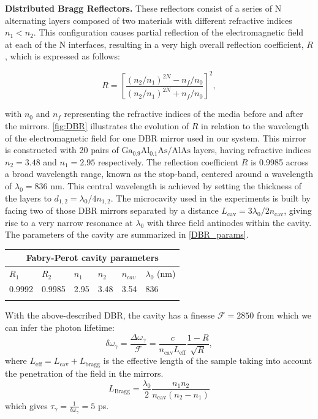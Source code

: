 \textbf{Distributed Bragg Reflectors.} These reflectors consist of a series of N alternating layers composed of two materials with different refractive indices $n_1<n_2$. This configuration causes partial reflection of the electromagnetic field at each of the N interfaces, resulting in a very high overall reflection coefficient, $R$, which is expressed as follows:

\begin{equation}
    R = \left[  \dfrac{(n_2/n_1)^{2N} - n_f/n_0}{(n_2/n_1)^{2N} + n_f/n_0} \right]^2,
\end{equation}

with $n_0$ and $n_f$ representing the refractive indices of the media before and after the mirrors. \autoref{fig:DBR} illustrates the evolution of $R$ in relation to the wavelength of the electromagnetic field for one DBR mirror used in our system. This mirror is constructed with 20 pairs of $\text{Ga}_{0.9}\text{Al}_{0.1}\text{As}/\text{AlAs}$ layers, having refractive indices $n_2 = 3.48$ and $n_1 = 2.95$ respectively. The reflection coefficient $R$ is 0.9985 across a broad wavelength range, known as the stop-band, centered around a wavelength of $\lambda_0 = 836$ nm. This central wavelength is achieved by setting the thickness of the layers to $d_{1,2} = \lambda_0 / 4n_{1,2}$. The microcavity used in the experiments is built by facing two of those DBR mirrors separated by a distance $L_{\mathrm{cav}}=3\lambda_0/2n_{\mathrm{cav}}$, giving rise to a very narrow resonance at $\lambda_0$ with three field antinodes within the cavity. The parameters of the cavity are summarized in \autoref{DBR_params}.

\begin{center}
    \begin{tabular}{ |p{1.5cm}|p{1.5cm}|p{1.5cm}|p{1.5cm}|p{1.5cm}|p{1.5cm}|}
    \hline
    \multicolumn{6}{|c|}{Fabry-Perot cavity parameters} \\
    \hline
    \hline
    $R_1$ & $R_2$ & $n_1$ & $n_2$ & $n_{cav}$ & $\lambda_0$ (nm) \\
    \hline
    0.9992  &  0.9985 & 2.95 & 3.48 & 3.54 & 836\\
    \hline
    \label{DBR_params}
    \end{tabular}
\end{center}

With the above-described DBR, the cavity has a finesse $\mathcal{F}=2850$ from which we can infer the photon lifetime:
\begin{equation}
    \delta \omega_{\gamma} = \dfrac{\Delta \omega_{\gamma}}{\mathcal{F}} = \dfrac{c}{n_{\mathrm{cav}} L_{\mathrm{eff}}} \dfrac{1-R}{\sqrt{R}},
\end{equation}
where $L_{\mathrm{eff}}= L_{\mathrm{cav}}+L_{\mathrm{bragg}}$ is the effective length of the sample taking into account the penetration of the field in the mirrors.
\begin{equation}
    L_{\mathrm{Bragg}} = \dfrac{\lambda_0}{2} \dfrac{n_1 n_2}{n_{\mathrm{cav}} (n_2 - n_1)}
\end{equation}
which gives $\tau_{\gamma} = \frac{1}{\delta \omega_{\gamma} }= 5$ ps.

